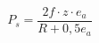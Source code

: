 \documentclass[12pt]{article}
\begin{document}
\begin{displaymath}
P_s=\frac{2f \cdot z \cdot e_a} {R + 0,5e_a}
\end{displaymath}
\end{document}
